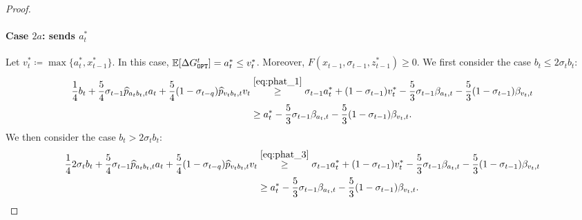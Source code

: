\begin{proof}
    \paragraph{Case $2a$: \opt sends $a_t^*$}
    Let $v_t^* \coloneqq \max\{a_t^*, x_{t-1}^*\}$. In this case, $\mathbb{E}[\Delta \Gopt^t] = a_t^* \le v_t^*$. Moreover, $F(x_{t-1}, \sigma_{t-1}, z_{t-1}^*) \ge 0$. We first consider the case $b_t \le 2\sigma_t b_t$:
    \begin{align*}
        \frac{1}{4}b_t+\frac{5}{4}\sigma_{t-1}\widehat{p}_{a_t b_t, t} a_t+\frac{5}{4}(1-\sigma_{t-q})\widehat{p}_{v_t b_t,t} v_t &\stackrel{\eqref{eq:phat_1}}{\ge} \sigma_{t-1}a_t^* +(1-\sigma_{t-1})v_t^*-\frac{5}{3}\sigma_{t-1}\beta_{a_t, t} - \frac{5}{3}(1-\sigma_{t-1})\beta_{v_t,t}\\
        &\ge a_t^*-\frac{5}{3}\sigma_{t-1}\beta_{a_t, t} - \frac{5}{3}(1-\sigma_{t-1})\beta_{v_t,t}.
    \end{align*}
    We then consider the case $b_t > 2\sigma_t b_t$:
    \begin{align*}
        \frac{1}{4}2 \sigma_t b_t+\frac{5}{4}\sigma_{t-1}\widehat{p}_{a_t b_t, t} a_t+\frac{5}{4}(1-\sigma_{t-q})\widehat{p}_{v_t b_t,t} v_t &\stackrel{\eqref{eq:phat_3}}{\ge} \sigma_{t-1}a_t^* +(1-\sigma_{t-1})v_t^*-\frac{5}{3}\sigma_{t-1}\beta_{a_t, t} - \frac{5}{3}(1-\sigma_{t-1})\beta_{v_t,t}\\
        &\ge a_t^*-\frac{5}{3}\sigma_{t-1}\beta_{a_t, t} - \frac{5}{3}(1-\sigma_{t-1})\beta_{v_t,t}.
    \end{align*}

\end{proof}
